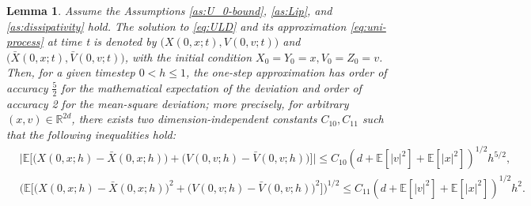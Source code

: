 \documentclass[12pt]{article}
\numberwithin{equation}{section}
\renewenvironment{proof}%
  {\begin{trivlist}%
   \item[]\ignorespaces}%
  {\qed\end{trivlist}}
\newtheorem{lem}{Lemma}[section]
\begin{document}




\iffalse
\begin{lem}\label{uni-onestep-finite-error}
    Assume the Assumptions \ref{as:U_0-bound}, \ref{as:Lip}, and \ref{as:dissipativity} hold. The solution to \eqref{eq:ULD} and its approximation \eqref{eq:uni-process} at time t is denoted by $\big(X(0,x;t), V(0,v;t)\big)$ and  $\big(\bar{X}(0,x;t), \bar{V}(0,v;t)\big)$, with the initial condition $X_0=Y_0=x, V_0=Z_0=v$. Then, for a given timestep $0<h\leq 1$, the one-step approximation has order of accuracy $\frac{5}{2}$ for the mathematical expectation of the deviation and order of accuracy 2 for the mean-square deviation; more precisely, for arbitrary $(x,v)\in \mathbb{R}^{2d}$, there exists two dimension-independent constants $C_{10}, C_{11}$ such that the following inequalities hold:
    \begin{align}
        &\Big|\mathbb{E}\big[\big(X(0,x;h)-\bar{X}(0,x;h)\big)+\big(V(0,v;h)-\bar{V}(0,v;h)\big)\big]\Big| \leq C_{10}(d+\mathbb{E}[|v|^2]+\mathbb{E}[|x|^2])^{1/2}h^{5/2}, \\
        &\Big(\mathbb{E}\big[\big(X(0,x;h)-\bar{X}(0,x;h)\big)^2+\big(V(0,v;h)-\bar{V}(0,v;h)\big)^2\big]\Big)^{1/2} \leq C_{11}(d+\mathbb{E}[|v|^2]+\mathbb{E}[|x|^2])^{1/2}h^{2}.
    \end{align}
\end{lem}
\end{document}
